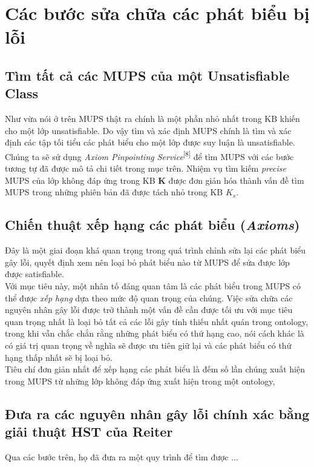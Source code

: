 \section{Các bước sửa chữa các phát biểu bị lỗi}

\subsection{Tìm tất cả các MUPS của một Unsatisfiable Class}
Như vừa nói ở trên MUPS thật ra chính là một phần nhỏ nhất trong KB khiến cho một lớp unsatisfiable. Do vậy tìm và xác định MUPS chính là tìm và xác định các tập tối tiểu các phát biểu cho một lớp được suy luận là  unsatisfiable. Chúng ta sẽ sử dụng \textit{Axiom Pinpointing Service}\textsuperscript{[8]} để tìm MUPS với các bước tương tự đã được mô tả chi tiết trong mục trên. Nhiệm vụ tìm kiếm \textit{precise} MUPS của lớp không đáp ứng trong KB \textbf{K} được đơn giản hóa thành vấn đề tìm MUPS trong những phiên bản đã được tách nhỏ trong KB $K_{s}$.
\subsection{Chiến thuật xếp hạng các phát biểu (\textit{Axioms})}
Đây là một giai đoạn khá quan trọng trong quá trình chỉnh sửa lại các phát biểu gây lỗi, quyết định xem nên loại bỏ phát biểu nào từ MUPS để sửa được lớp được satisfiable.
\\
\hspace{.05\textwidth} Với mục tiêu này, một nhân tố đáng quan tâm là các phát biểu trong MUPS có thể được \textit{xếp hạng} dựa theo mức độ quan trọng của chúng. Việc sửa chữa các nguyên nhân gây lỗi được trở thành một vấn đề cần được tối ưu với mục tiêu quan trọng nhất là loại bỏ tất cả các lỗi gây tính thiếu nhất quán trong ontology, trong khi vẫn chắc chắn rằng những phát biểu có thứ hạng cao, nói cách khác là có giá trị quan trọng về nghĩa sẽ được ưu tiên giữ lại và các phát biểu có thứ hạng thấp nhất sẽ bị loại bỏ.
\\
\hspace{.05\textwidth} Tiêu chí đơn giản nhất để xếp hạng các phát biểu là đếm số lần chúng xuất hiện trong MUPS từ những lớp không đáp ứng xuất hiện trong một ontology,
\subsection{Đưa ra các nguyên nhân gây lỗi chính xác bằng giải thuật HST của Reiter}
Qua các bước trên, họ đã đưa ra một quy trình để tìm được ...


